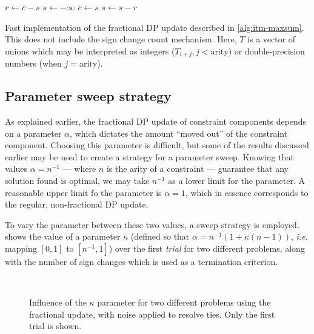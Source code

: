 \begin{algorithm}[tbp]
	\(r \leftarrow \bar{c} - s\) \;
	\(s \leftarrow -\infty\) \;
	\(\bar{c} \leftarrow s\) \;
	\(s \leftarrow s - r\) \;
	\caption{Fast implementation of the fractional DP update described in \cref{alg:itm-maxsum}. This does not include the sign change count mechanism. Here, \(T\) is a vector of unions which may be interpreted as integers (\(T_{i+j}, j < \text{arity}\)) or double-precision numbers (when \(j = \text{arity}\)).}
	\label{alg:itm-maxsum-fast}
\end{algorithm}

\subsection{Parameter sweep strategy}
As explained earlier, the fractional DP update of constraint components depends on a parameter \(\alpha\), which dictates the amount \enquote{moved out} of the constraint component.
Choosing this parameter is difficult, but some of the results discussed earlier may be used to create a strategy for a parameter sweep.
Knowing that values \(\alpha=n^{-1}\) --- where \(n\) is the arity of a constraint --- guarantee that any solution found is optimal, we may take \(n^{-1}\) as a lower limit for the parameter.
A reasonable upper limit fo the parameter is \(\alpha=1\), which in essence corresponds to the regular, non-fractional DP update.

To vary the parameter between these two values, a sweep strategy is employed.
 shows the value of a parameter \(\kappa\) (defined so that \(\alpha = n^{-1}\left(1 + \kappa(n - 1)\right)\), \emph{i.e.} mapping \(\left[0,1\right]\) to \(\left[n^{-1},1\right]\)) over the first \emph{trial} for two different problems, along with the number of sign changes which is used as a termination criterion.

\begin{figure}[p]
	\centering
	\\
	\caption{Influence of the \(\kappa\) parameter for two different problems using the fractional update, with noise applied to resolve ties. Only the first trial is shown.}
	\label{fig:khappa-plot}
\end{figure}

